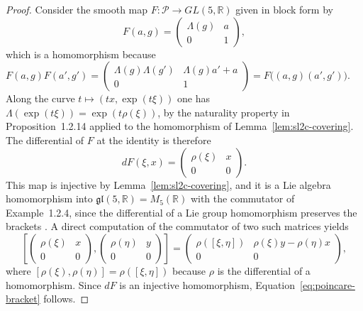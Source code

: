 	\begin{proof}
		Consider the smooth map $F:\mathcal{P}\to GL(5,\mathbb{R})$ given in block form by
		\begin{equation*}
			F(a,g)=\begin{pmatrix}\Lambda(g)&a\\0&1\end{pmatrix},
		\end{equation*}
		which is a homomorphism because $F(a,g)F(a',g')=\begin{pmatrix}\Lambda(g)\Lambda(g')&\Lambda(g)a'+a\\0&1\end{pmatrix}=F\big((a,g)(a',g')\big)$. Along the curve $t\mapsto(tx,\exp(t\xi))$ one has $\Lambda(\exp(t\xi))=\exp(t\rho(\xi))$, by the naturality property in Proposition~1.2.14 applied to the homomorphism of Lemma~\ref{lem:sl2c-covering}. The differential of $F$ at the identity is therefore
		\begin{equation*}
			dF(\xi,x)=\begin{pmatrix}\rho(\xi)&x\\0&0\end{pmatrix}.
		\end{equation*}
		This map is injective by Lemma~\ref{lem:sl2c-covering}, and it is a Lie algebra homomorphism into $\mathfrak{gl}(5,\mathbb{R})=M_5(\mathbb{R})$ with the commutator of Example~1.2.4, since the differential of a Lie group homomorphism preserves the brackets \cite[TODO-location]{TODO-Lee13}. A direct computation of the commutator of two such matrices yields
		\begin{equation*}
			\left[\begin{pmatrix}\rho(\xi)&x\\0&0\end{pmatrix},\begin{pmatrix}\rho(\eta)&y\\0&0\end{pmatrix}\right]=\begin{pmatrix}\rho([\xi,\eta])&\rho(\xi)y-\rho(\eta)x\\0&0\end{pmatrix},
		\end{equation*}
		where $[\rho(\xi),\rho(\eta)]=\rho([\xi,\eta])$ because $\rho$ is the differential of a homomorphism. Since $dF$ is an injective homomorphism, Equation~\eqref{eq:poincare-bracket} follows.
		

\end{proof}
